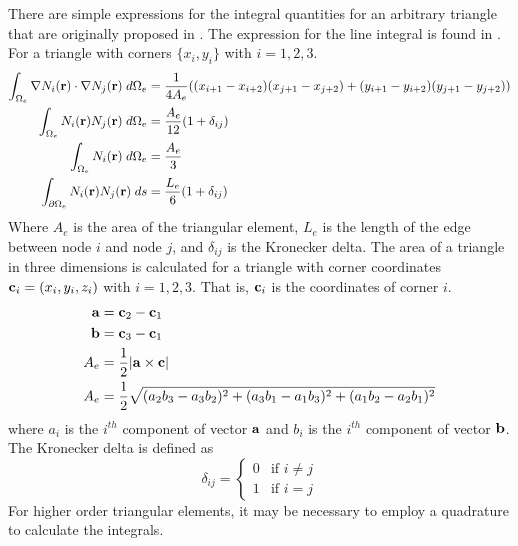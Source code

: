       There are simple expressions
      for the integral quantities for an arbitrary triangle that are originally
      proposed in \cite{textbookwhite}. The expression for
      the line integral is found in \cite{computerLab}. For a triangle with 
      corners $\{ x_i,y_i \}$ with $i=1,2,3$.
      \begin{align}
        \int_{\Omega_e} \mathbf{\nabla} N_i(\mathbf{r}) \cdot \mathbf{\nabla} N_j(\mathbf{r}) 
          \;d\Omega_e &= \frac{1}{4 A_e}
          ((x_{i+1}-x_{i+2})(x_{j+1}-x_{j+2}) + 
          (y_{i+1}-y_{i+2})(y_{j+1}-y_{j+2})) \\
        \int_{\Omega_e} N_i(\mathbf{r}) N_j(\mathbf{r}) \;d\Omega_e &= 
          \frac{A_e}{12} (1+\delta_{ij}) \\
        \int_{\Omega_e} N_i(\mathbf{r}) \;d\Omega_e &= \frac{A_e}{3} \\
        \int_{\partial \Omega_e} N_i(\mathbf{r}) N_j(\mathbf{r}) \;ds &=
          \frac{L_e}{6}(1+\delta_{ij}) \\
      \end{align}
      Where $A_e$ is the area of the triangular element, $L_e$ is the length of 
      the edge between node $i$ and node $j$, and $\delta_{ij}$ is the Kronecker
      delta. The area of a triangle in three dimensions is calculated for a
      triangle with corner coordinates $\mathbf{c}_i = (x_i, y_i, z_i)$ with $i=1,2,3$.
      That is, $\mathbf{c}_i$ is the coordinates of corner $i$.
      \begin{align}
        \mathbf{a} &= \mathbf{c}_2 - \mathbf{c}_1 \\
        \mathbf{b} &= \mathbf{c}_3 - \mathbf{c}_1 \\
        A_e &= \frac{1}{2} \lvert \mathbf{a} \times \mathbf{c} \rvert \\
        \label{eq:area_triangle}
        A_e &= \frac{1}{2} \sqrt{ (a_2 b_3 - a_3 b_2)^2 + (a_3 b_1 - a_1 b_3)^2 +
          (a_1 b_2 - a_2 b_1)^2}
      \end{align}
      where $a_i$ is the $i^{th}$ component of vector $\mathbf{a}$ and $b_i$ is the
      $i^{th}$ component of vector $\mathbf{b}$.
      The Kronecker delta is defined as
      \begin{equation} \label{eq:kroneker_delta}
        \delta_{ij} =
        \begin{cases}
          0 & \text{if } i \ne j \\
          1 & \text{if } i = j
        \end{cases}
      \end{equation}
      For higher order triangular elements, it may be necessary to employ a 
      quadrature to calculate the integrals.
